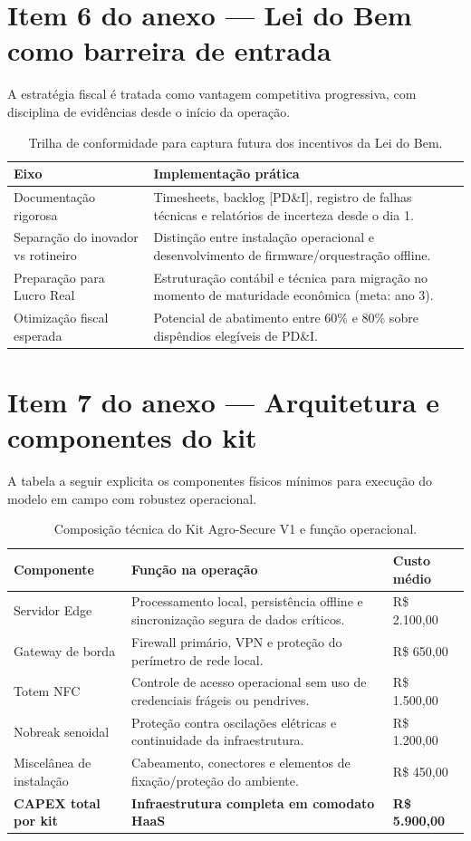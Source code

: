\section{Item 6 do anexo --- Lei do Bem como barreira de entrada}
\noindent A estratégia fiscal é tratada como vantagem competitiva progressiva, com disciplina de evidências desde o início da operação.
\begin{table}[H]
\centering
\caption{Trilha de conformidade para captura futura dos incentivos da Lei do Bem.}
\begin{tabular}{|p{4.5cm}|p{7.0cm}|}
\hline
\textbf{Eixo} & \textbf{Implementação prática} \\
\hline
Documentação rigorosa & Timesheets, backlog [PD\&I], registro de falhas técnicas e relatórios de incerteza desde o dia 1. \\
\hline
Separação do inovador vs rotineiro & Distinção entre instalação operacional e desenvolvimento de firmware/orquestração offline. \\
\hline
Preparação para Lucro Real & Estruturação contábil e técnica para migração no momento de maturidade econômica (meta: ano 3). \\
\hline
Otimização fiscal esperada & Potencial de abatimento entre 60\% e 80\% sobre dispêndios elegíveis de PD\&I. \\
\hline
\end{tabular}
\end{table}

\section{Item 7 do anexo --- Arquitetura e componentes do kit}
\noindent A tabela a seguir explicita os componentes físicos mínimos para execução do modelo em campo com robustez operacional.
\begin{table}[H]
\centering
\caption{Composição técnica do Kit Agro-Secure V1 e função operacional.}
\begin{tabular}{|p{3.3cm}|p{5.1cm}|p{3.2cm}|}
\hline
\textbf{Componente} & \textbf{Função na operação} & \textbf{Custo médio} \\
\hline
Servidor Edge & Processamento local, persistência offline e sincronização segura de dados críticos. & R\$ 2.100,00 \\
\hline
Gateway de borda & Firewall primário, VPN e proteção do perímetro de rede local. & R\$ 650,00 \\
\hline
Totem NFC & Controle de acesso operacional sem uso de credenciais frágeis ou pendrives. & R\$ 1.500,00 \\
\hline
Nobreak senoidal & Proteção contra oscilações elétricas e continuidade da infraestrutura. & R\$ 1.200,00 \\
\hline
Miscelânea de instalação & Cabeamento, conectores e elementos de fixação/proteção do ambiente. & R\$ 450,00 \\
\hline
\textbf{CAPEX total por kit} & \textbf{Infraestrutura completa em comodato HaaS} & \textbf{R\$ 5.900,00} \\
\hline
\end{tabular}
\end{table}


